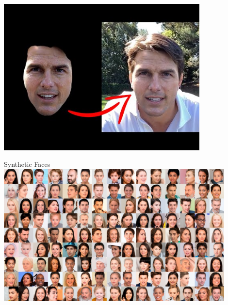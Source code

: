 \documentclass[nobackground,dvipsnames,table,aspectratio=169]{beamer}
\begin{document}
\begin{frame}{}
    \centering
    \href{https://youtu.be/wq-kmFCrF5Q}{\includegraphics[width=0.8\textwidth]{deepfake-tom-cruise}}
\end{frame}

\begin{frame}{Synthetic Faces}
    \centering
    \includegraphics[width=0.9\textwidth]{synthetic-faces}
\end{frame}
\end{document}
